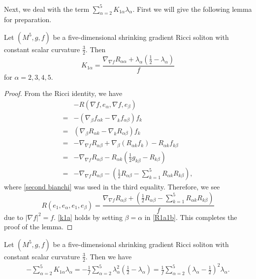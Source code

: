 \documentclass[12pt]{amsart}
\newcommand{\ban}{\begin{eqnarray*}}
\newcommand{\ean}{\end{eqnarray*}}
\begin{document}
	Next, we deal with the term $\sum_{\alpha=2}^5 K_{1\alpha}\lambda_\alpha$. First we will give the following lemma for preparation.
	
	\begin{lem} Let $(M^5, g, f)$ be a five-dimensional shrinking gradient Ricci soliton with constant scalar curvature $\frac{3}{2}$. Then
		\begin{equation}\label{k1a}
		K_{1\alpha}=\frac{\nabla_{\nabla f}R_{\alpha\alpha} +\lambda_\alpha(\frac{1}{2}-\lambda_\alpha)}{f}
		\end{equation}	
		for $\alpha=2,  3 ,4, 5.$	
	\end{lem}
	
	\begin{proof}
		From the Ricci identity, we have
		\begin{equation*}
		\begin{aligned}
		&-R(\nabla f, e_\alpha, \nabla f, e_\beta) \\
		=&-\left( \nabla_\beta f_{\alpha k} - \nabla_kf_{\alpha \beta}\right) f_{k}\\
		=&\left( \nabla_\beta R_{\alpha k} - \nabla_kR_{\alpha \beta}\right) f_{k}\\
		=&-  \nabla_{\nabla f} R_{\alpha \beta}+\nabla_{\beta}(R_{\alpha k} f_k)- R_{\alpha k}f_{ k\beta}\\
		=&-  \nabla_{\nabla f} R_{\alpha \beta}- R_{\alpha k}\left( \frac{1}{2}g_{ k\beta}-R_{ k\beta} \right) \\
		=&- \nabla_{\nabla f} R_{\alpha \beta}-\left( \frac{1}{2}R_{\alpha \beta}-\sum_{k=1}^5R_{\alpha k}R_{k\beta}\right),
		\end{aligned}
		\end{equation*}
		where \eqref{second bianchi} was used in the third equality. Therefore, we see
		\begin{equation}\label{R1a1b}
		R(e_1, e_\alpha, e_1, e_\beta)=\frac{ \nabla_{\nabla f} R_{\alpha \beta}+\left( \frac{1}{2}R_{\alpha \beta}-\sum_{k=1}^5 R_{\alpha k}R_{k\beta}\right) }{f}
		\end{equation}
		due to $|\nabla f|^2=f$. \eqref{k1a} holds by setting $\beta=\alpha$ in \eqref{R1a1b}.
		This completes the proof of the lemma.
	\end{proof}
	
	\begin{lem}\label{lek1a}
		Let $(M^5, g, f)$ be a five-dimensional shrinking gradient Ricci soliton with constant scalar curvature $\frac{3}{2}$. Then we have
		\ban
		 -\sum_{\alpha=2}^5K_{1\alpha}\lambda_\alpha=-\frac{1}{f}\sum_{\alpha=2}^5\lambda_\alpha^2(\frac{1}{2}-\lambda_\alpha)=\frac{1}{f}\sum_{\alpha=2}^5(\lambda_\alpha-\frac{1}{2})^2\lambda_\alpha.
		\ean
	\end{lem}
	
\end{document}
